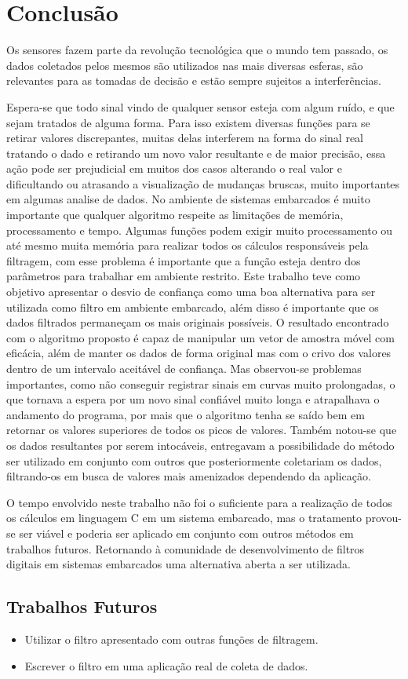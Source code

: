 
\chapter{Conclusão}\label{cap:conclusao}

Os sensores fazem parte da revolução tecnológica que o mundo tem passado, os dados coletados pelos mesmos são utilizados nas mais diversas esferas, são relevantes para as tomadas de decisão e estão sempre sujeitos a interferências.
 
Espera-se que todo sinal vindo de qualquer sensor esteja com algum ruído, e que sejam tratados de alguma forma. Para isso existem diversas funções para se retirar valores discrepantes, muitas delas interferem na forma do sinal real tratando o dado e retirando um novo valor resultante e de maior precisão, essa ação pode ser prejudicial em muitos dos casos alterando o real valor e dificultando ou atrasando a visualização de mudanças bruscas, muito importantes em algumas analise de dados. No ambiente de sistemas embarcados é muito importante que qualquer algoritmo respeite as limitações de memória, processamento e tempo. Algumas funções podem exigir muito processamento ou até mesmo muita memória para realizar todos os cálculos responsáveis pela filtragem, com esse problema é importante que a função esteja dentro dos parâmetros para trabalhar em ambiente restrito.
Este trabalho teve como objetivo apresentar o desvio de confiança como uma boa alternativa para ser utilizada como filtro em ambiente embarcado, além disso é importante que os dados filtrados permaneçam os mais originais possíveis. 
O resultado encontrado com o algoritmo proposto é capaz de manipular um vetor de amostra móvel com eficácia, além de manter os dados de forma original mas com o crivo dos valores dentro de um intervalo aceitável de confiança. Mas observou-se problemas importantes, como não conseguir registrar sinais em curvas muito prolongadas, o que tornava a espera por um novo sinal confiável muito longa e atrapalhava o andamento do programa, por mais que o algoritmo tenha se saído bem em retornar os valores superiores de todos os picos de valores. Também notou-se que os dados resultantes por serem intocáveis, entregavam a possibilidade do método ser utilizado em conjunto com outros que posteriormente coletariam os dados, filtrando-os em busca de valores mais amenizados dependendo da aplicação.
 
O tempo envolvido neste trabalho não foi o suficiente para a realização de todos os cálculos em linguagem C em um sistema embarcado, mas o tratamento provou-se ser viável e poderia ser aplicado em conjunto com outros métodos em trabalhos futuros. Retornando à comunidade de desenvolvimento de filtros digitais em sistemas embarcados uma alternativa aberta a ser utilizada.


\section{Trabalhos Futuros}

\begin{itemize}
    \item Utilizar o filtro apresentado com outras funções de filtragem.
    \item Escrever o filtro em uma aplicação real de coleta de dados.
  \end{itemize}
